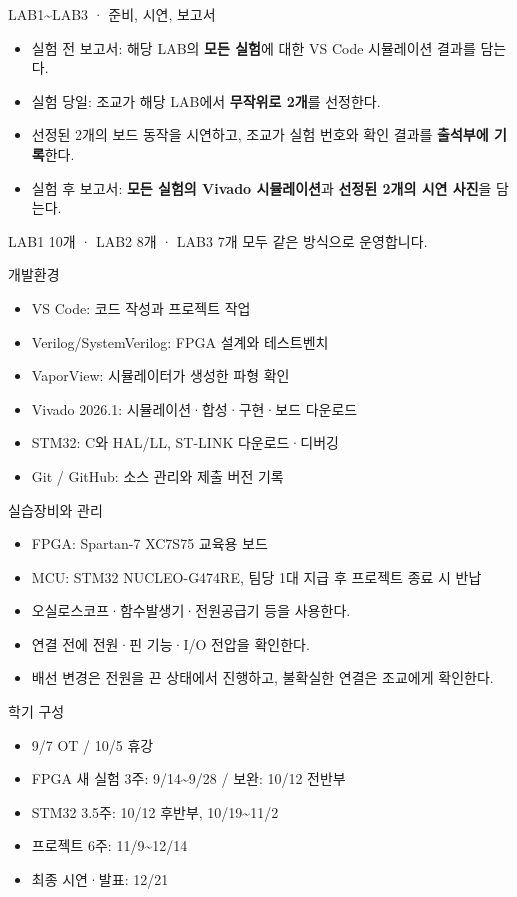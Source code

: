 \documentclass[aspectratio=169,11pt,t]{beamer}
\begin{document}
\begin{frame}{LAB1\textasciitilde{}LAB3 · 준비, 시연, 보고서}
\begin{itemize}
\item 실험 전 보고서: 해당 LAB의 \textbf{모든 실험}에 대한 VS Code 시뮬레이션 결과를 담는다.
\item 실험 당일: 조교가 해당 LAB에서 \textbf{무작위로 2개}를 선정한다.
\item 선정된 2개의 보드 동작을 시연하고, 조교가 실험 번호와 확인 결과를 \textbf{출석부에 기록}한다.
\item 실험 후 보고서: \textbf{모든 실험의 Vivado 시뮬레이션}과 \textbf{선정된 2개의 시연 사진}을 담는다.
\end{itemize}
\vspace{0.2cm}
LAB1 10개 · LAB2 8개 · LAB3 7개 모두 같은 방식으로 운영합니다.
\end{frame}

\begin{frame}{개발환경}
\begin{itemize}
\item VS Code: 코드 작성과 프로젝트 작업
\item Verilog/SystemVerilog: FPGA 설계와 테스트벤치
\item VaporView: 시뮬레이터가 생성한 파형 확인
\item Vivado 2026.1: 시뮬레이션·합성·구현·보드 다운로드
\item STM32: C와 HAL/LL, ST-LINK 다운로드·디버깅
\item Git / GitHub: 소스 관리와 제출 버전 기록
\end{itemize}
\end{frame}

\begin{frame}{실습장비와 관리}
\begin{itemize}
\item FPGA: Spartan-7 XC7S75 교육용 보드
\item MCU: STM32 NUCLEO-G474RE, 팀당 1대 지급 후 프로젝트 종료 시 반납
\item 오실로스코프·함수발생기·전원공급기 등을 사용한다.
\item 연결 전에 전원·핀 기능·I/O 전압을 확인한다.
\item 배선 변경은 전원을 끈 상태에서 진행하고, 불확실한 연결은 조교에게 확인한다.
\end{itemize}
\end{frame}

\begin{frame}{학기 구성}
\begin{itemize}
\item 9/7 OT / 10/5 휴강
\item FPGA 새 실험 3주: 9/14\textasciitilde{}9/28 / 보완: 10/12 전반부
\item STM32 3.5주: 10/12 후반부, 10/19\textasciitilde{}11/2
\item 프로젝트 6주: 11/9\textasciitilde{}12/14
\item 최종 시연·발표: 12/21
\end{itemize}
\end{frame}
\end{document}
